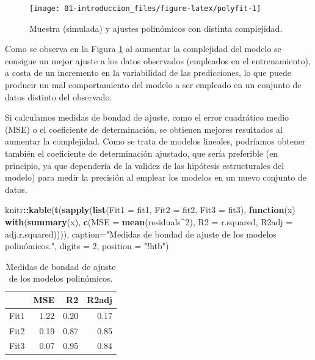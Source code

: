 \documentclass[
  spanish,
]{book}
\newenvironment{Shaded}{\begin{snugshade}}{\end{snugshade}}
\newcommand{\ControlFlowTok}[1]{\textcolor[rgb]{0.13,0.29,0.53}{\textbf{#1}}}
\newcommand{\DataTypeTok}[1]{\textcolor[rgb]{0.13,0.29,0.53}{#1}}
\newcommand{\DecValTok}[1]{\textcolor[rgb]{0.00,0.00,0.81}{#1}}
\newcommand{\KeywordTok}[1]{\textcolor[rgb]{0.13,0.29,0.53}{\textbf{#1}}}
\newcommand{\NormalTok}[1]{#1}
\newcommand{\OperatorTok}[1]{\textcolor[rgb]{0.81,0.36,0.00}{\textbf{#1}}}
\newcommand{\StringTok}[1]{\textcolor[rgb]{0.31,0.60,0.02}{#1}}
\theoremstyle{break}
\theoremstyle{definition}
\theoremstyle{definition}
\theoremstyle{definition}
\theoremstyle{remark}
\begin{document}
\begin{figure}[!htb]

{\centering \texttt{[image: 01-introduccion\_files/figure-latex/polyfit-1]} 

}

\caption{Muestra (simulada) y ajustes polinómicos con distinta complejidad.}\label{fig:polyfit}
\end{figure}

Como se observa en la Figura \ref{fig:polyfit} al aumentar la complejidad del modelo se consigue un mejor ajuste a los datos observados (empleados en el entrenamiento), a costa de un incremento en la variabilidad de las predicciones, lo que puede producir un mal comportamiento del modelo a ser empleado en un conjunto de datos distinto del observado.

Si calculamos medidas de bondad de ajuste, como el error cuadrático medio (MSE) o el coeficiente de determinación, se obtienen mejores resultados al aumentar la complejidad.
Como se trata de modelos lineales, podríamos obtener también el coeficiente de determinación ajustado, que sería preferible (en principio, ya que dependería de la validez de las hipótesis estructurales del modelo) para medir la precisión al emplear los modelos en un nuevo conjunto de datos.

\begin{Shaded}
\begin{Highlighting}[]
\NormalTok{knitr}\OperatorTok{::}\KeywordTok{kable}\NormalTok{(}\KeywordTok{t}\NormalTok{(}\KeywordTok{sapply}\NormalTok{(}\KeywordTok{list}\NormalTok{(}\DataTypeTok{Fit1 =}\NormalTok{ fit1, }\DataTypeTok{Fit2 =}\NormalTok{ fit2, }\DataTypeTok{Fit3 =}\NormalTok{ fit3), }
    \ControlFlowTok{function}\NormalTok{(x) }\KeywordTok{with}\NormalTok{(}\KeywordTok{summary}\NormalTok{(x), }
        \KeywordTok{c}\NormalTok{(}\DataTypeTok{MSE =} \KeywordTok{mean}\NormalTok{(residuals}\OperatorTok{^}\DecValTok{2}\NormalTok{), }\DataTypeTok{R2 =}\NormalTok{ r.squared, }\DataTypeTok{R2adj =}\NormalTok{ adj.r.squared)))), }
    \DataTypeTok{caption=}\StringTok{"Medidas de bondad de ajuste de los modelos polinómicos."}\NormalTok{, }\DataTypeTok{digits =} \DecValTok{2}\NormalTok{, }\DataTypeTok{position =} \StringTok{"!htb"}\NormalTok{)}
\end{Highlighting}
\end{Shaded}

\begin{table}[!htb]

\caption{\label{tab:unnamed-chunk-2}Medidas de bondad de ajuste de los modelos polinómicos.}
\centering
\begin{tabular}[t]{l|r|r|r}
\hline
  & MSE & R2 & R2adj\\
\hline
Fit1 & 1.22 & 0.20 & 0.17\\
\hline
Fit2 & 0.19 & 0.87 & 0.85\\
\hline
Fit3 & 0.07 & 0.95 & 0.84\\
\hline
\end{tabular}
\end{table}
\end{document}
